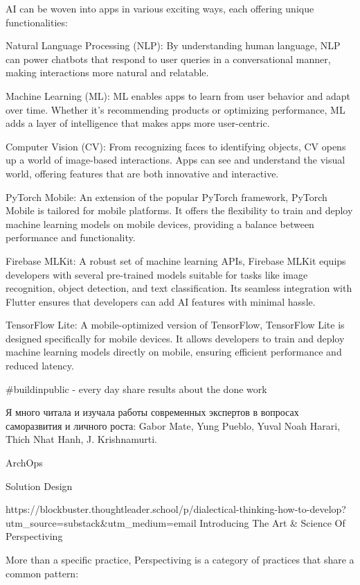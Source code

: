 

AI can be woven into apps in various exciting ways, each offering unique functionalities:

Natural Language Processing (NLP): By understanding human language, NLP can power chatbots that respond to user 
queries in a conversational manner, making interactions more natural and relatable.

Machine Learning (ML): ML enables apps to learn from user behavior and adapt over time. Whether it’s recommending 
products or optimizing performance, ML adds a layer of intelligence that makes apps more user-centric.

Computer Vision (CV): From recognizing faces to identifying objects, CV opens up a world of image-based interactions. 
Apps can see and understand the visual world, offering features that are both innovative and interactive.


PyTorch Mobile: An extension of the popular PyTorch framework, PyTorch Mobile is tailored for mobile platforms. 
It offers the flexibility to train and deploy machine learning models on mobile devices, providing a balance between 
performance and functionality.

Firebase MLKit: A robust set of machine learning APIs, Firebase MLKit equips developers with several pre-trained models 
suitable for tasks like image recognition, object detection, and text classification. Its seamless integration with 
Flutter ensures that developers can add AI features with minimal hassle.

TensorFlow Lite: A mobile-optimized version of TensorFlow, TensorFlow Lite is designed specifically for mobile devices. 
It allows developers to train and deploy machine learning models directly on mobile, ensuring efficient performance and 
reduced latency.

#buildinpublic - every day share results about the done work

Я много читала и изучала работы современных экспертов в вопросах саморазвития и личного роста: Gabor Mate, Yung Pueblo, 
Yuval Noah Harari, Thich Nhat Hanh, J. Krishnamurti. 

ArchOps

Solution Design


https://blockbuster.thoughtleader.school/p/dialectical-thinking-how-to-develop?utm_source=substack&utm_medium=email
Introducing The Art & Science Of Perspectiving

More than a specific practice, Perspectiving is a category of practices that share a common pattern:


